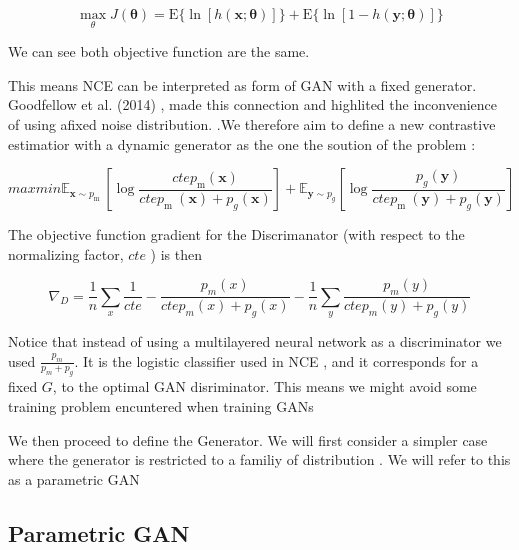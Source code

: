 \documentclass{article}
\begin{document}
\begin{equation}
\max _{\theta}J(\boldsymbol{\theta})=\mathrm{E}\{\ln [h(\mathbf{x} ; \boldsymbol{\theta})]\}+ \mathrm{E}\{\ln [1-h(\mathbf{y} ; \boldsymbol{\theta})]\}
\end{equation}



We can see both objective function are the same.

This means NCE can be interpreted as  form of GAN  with a fixed generator. Goodfellow et al. (2014) , made this connection and  highlited the inconvenience of using afixed noise distribution. .We therefore aim to define a new contrastive estimatior with a dynamic generator as the one the soution of the problem :

\begin{equation} max min \mathbb{E}_{\boldsymbol{x} \sim p_{\text {m }}}\left[\log \frac{ctep_{\text {m}}(\boldsymbol{x})}{ctep_{\text {m }}(\boldsymbol{x})+p_{g}(\boldsymbol{x})}\right]+\mathbb{E}_{\boldsymbol{y} \sim p_{g}}\left[\log \frac{p_{g}(\boldsymbol{y})}{ctep_{\text {m }}(\boldsymbol{y})+p_{g}(\boldsymbol{y})}\right]\end{equation}
 
The  objective function gradient for the Discrimanator (with respect to the normalizing factor, $cte$ ) is then

\begin{equation}
\nabla_{D} =  \frac{1}{n} \sum_{x} \frac{1}{cte} -   \frac{ p_{m}(x)}{ctep_{m}(x)+p_{g}(x) } - \frac{1}{n}\sum_{y} \frac{ p_{m}(y)}{ctep_{m}(y)+p_{g}(y)}     
\end{equation}

Notice that instead of using a multilayered neural network as a discriminator we used $\frac{p_{m}}{p_{m}+p_{g}}$.  It  is the logistic classifier used in NCE ,  and it corresponds for a fixed $G$, to  the optimal GAN disriminator.  This means we might avoid some training problem encuntered when training GANs

We then proceed to define the Generator. We will first consider a simpler case where the  generator is restricted to a familiy of distribution . We will refer to  this as a parametric GAN 


\subsection{Parametric GAN}
\end{document}
